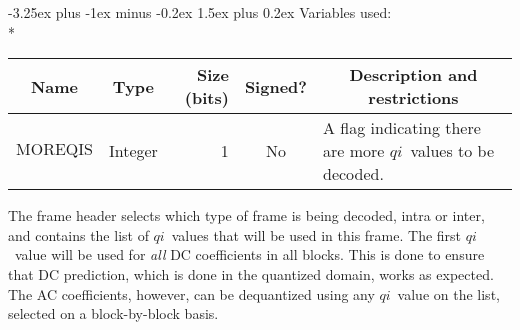 \documentclass[9pt,letterpaper]{book}
\makeatletter
\newcommand{\idx}[1]{{\ensuremath{\mathit{#1}}}}
\newcommand{\qi}{\idx{qi}}
\newcommand{\locvar}[1]{\ensuremath{\mathrm{#1}}}
\numberwithin{equation}{chapter}
\numberwithin{figure}{chapter}
\numberwithin{table}{chapter}
\renewcommand{\paragraph}{\@startsection{paragraph}{4}{0ex}%
 {-3.25ex plus -1ex minus -0.2ex}%
 {1.5ex plus 0.2ex}%
 {\normalfont\normalsize\bfseries}}
\makeatother
\begin{document}
\paragraph{Variables used:}\hfill\\*
\begin{tabularx}{\textwidth}{@{}llrcX@{}}\toprule
\multicolumn{1}{c}{Name} &
\multicolumn{1}{c}{Type} &
\multicolumn{1}{p{30pt}}{\centering Size (bits)} &
\multicolumn{1}{c}{Signed?} &
\multicolumn{1}{c}{Description and restrictions} \\\midrule\endhead
\locvar{MOREQIS} & Integer &  1 & No & A flag indicating there are more
 \qi\ values to be decoded. \\
\bottomrule\end{tabularx}
\medskip

The frame header selects which type of frame is being decoded, intra or inter,
 and contains the list of \qi\ values that will be used in this frame.
The first \qi\ value will be used for {\em all} DC coefficients in all blocks.
This is done to ensure that DC prediction, which is done in the quantized
 domain, works as expected.
The AC coefficients, however, can be dequantized using any \qi\ value on the
 list, selected on a block-by-block basis.
\end{document}
